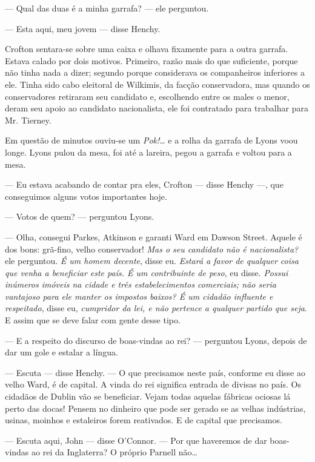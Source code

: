 --- Qual das duas é a minha garrafa? --- ele perguntou.

--- Esta aqui, meu jovem --- disse Henchy.

Crofton sentara-se sobre uma caixa e olhava fixamente para a outra
garrafa. Estava calado por dois motivos. Primeiro, razão mais do que
suficiente, porque não tinha nada a dizer; segundo porque
considerava os companheiros inferiores a ele. Tinha sido cabo
eleitoral de Wilkimis, da facção conservadora, mas quando os
conservadores retiraram seu candidato e, escolhendo entre os males o
menor, deram seu apoio ao candidato nacionalista, ele foi contratado
para trabalhar para Mr. Tierney.

Em questão de minutos ouviu-se um \textit{Pok!}\ldots{} e a rolha da garrafa de
Lyons voou longe. Lyons pulou da mesa, foi até a lareira, pegou a
garrafa e voltou para a mesa.

--- Eu estava acabando de contar pra eles, Crofton --- disse Henchy
---, que conseguimos alguns votos importantes hoje.

--- Votos de quem? --- perguntou Lyons.

--- Olha, consegui Parkes, Atkinson e garanti Ward em Dawson Street.
Aquele é dos bons: grã-fino, velho conservador! \textit{Mas o seu candidato
não é nacionalista?} ele perguntou. \textit{É um homem decente}, disse eu.
\textit{Estará a favor de qualquer coisa que venha a beneficiar este país. É um
contribuinte de peso}, eu disse. \textit{Possui inúmeros imóveis na cidade e
três estabelecimentos comerciais; não seria vantajoso para ele manter
os impostos baixos? É um cidadão influente e respeitado}, disse eu,
\textit{cumpridor da lei, e não pertence a qualquer partido que seja}. E assim
que se deve falar com gente desse tipo.

--- E a respeito do discurso de boas-vindas ao rei? --- perguntou
Lyons, depois de dar um gole e estalar a língua.

--- Escuta --- disse Henchy. --- O que precisamos neste país, conforme
eu disse ao velho Ward, é de capital. A vinda do rei significa entrada
de divisas no país. Os cidadãos de Dublin vão se beneficiar. Vejam
todas aquelas fábricas ociosas lá perto das docas! Pensem no
dinheiro que pode ser gerado se as velhas indústrias, usinas,
moinhos e estaleiros forem reativados. E de capital que precisamos.

--- Escuta aqui, John --- disse O'Connor. --- Por que haveremos de dar
boas-vindas ao rei da Inglaterra? O próprio Parnell não\ldots{}

